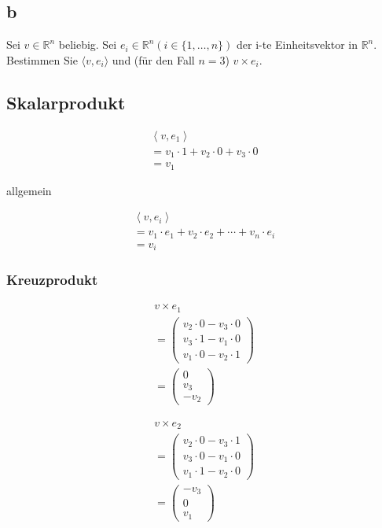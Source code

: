 \subsection{b}
Sei $v \in \mathbb{R}^n$ beliebig. Sei $e_i \in \mathbb{R}^n (i \in \{1, \dots,
    n\})$ der i-te Einheitsvektor in $\mathbb{R}^n$. Bestimmen Sie $\langle v, e_i
    \rangle$ und (für den Fall $n = 3$) $v \times e_i$.

\subsection*{Skalarprodukt}

\begin{align*}
    \left\langle v, e_1 \right\rangle         \\
    = v_1 \cdot 1 + v_2 \cdot 0 + v_3 \cdot 0 \\
    = v_1
\end{align*}

allgemein

\begin{align*}
    \left\langle v, e_i \right\rangle                        \\
    = v_1 \cdot e_1 + v_2 \cdot e_2 + \cdots + v_n \cdot e_i \\
    = v_i
\end{align*}

\subsubsection*{Kreuzprodukt}
\begin{align*}
    v \times e_1                \\
    = \begin{pmatrix}
          v_2 \cdot 0 - v_3 \cdot 0 \\
          v_3 \cdot 1 - v_1 \cdot 0 \\
          v_1 \cdot 0 - v_2 \cdot 1
      \end{pmatrix} \\
    = \begin{pmatrix}
          0 \\ v_3 \\ -v_2
      \end{pmatrix}
\end{align*}

\begin{align*}
    v \times e_2                \\
    = \begin{pmatrix}
          v_2 \cdot 0 - v_3 \cdot 1 \\
          v_3 \cdot 0 - v_1 \cdot 0 \\
          v_1 \cdot 1 - v_2 \cdot 0
      \end{pmatrix} \\
    = \begin{pmatrix}
          -v_3 \\ 0 \\ v_1
      \end{pmatrix}
\end{align*}

